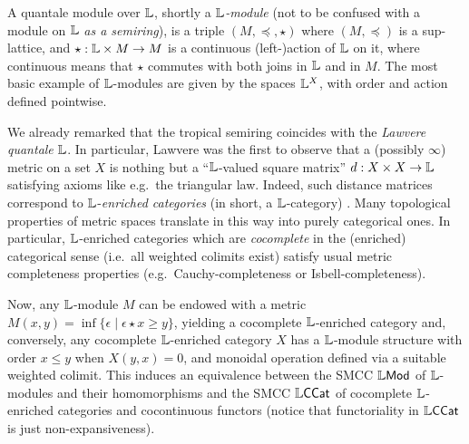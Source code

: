 \documentclass[submission,%
]{eptcs}
\begin{document}
A quantale module over $\mathbb{L}$, shortly a \emph{$\mathbb{L}$-module} (not to be confused with a module on $\mathbb{L}$ \emph{as a semiring}), is a triple  $(M,\preceq, \star)$ where $(M, \preceq)$ is a sup-lattice, and $\star: \mathbb{L} \times M \to M$ is a continuous (left-)action of $\mathbb{L}$ on it, where continuous means that $\star$ commutes with both joins in $\mathbb{L}$ and in $M$. 
The most basic example of $\mathbb{L}$-modules are given by the spaces $\mathbb{L}^{X}$, with order and action defined pointwise.



We already remarked that the tropical semiring coincides with the \emph{Lawvere quantale} $\mathbb{L}$.
In particular, Lawvere was the first to observe that a (possibly $\infty$) metric on a set $X$ is nothing but a ``$\mathbb{L}$-valued square matrix'' $d:X\times X\to \mathbb{L}$ satisfying axioms like e.g.~the triangular law.
Indeed, such distance matrices correspond to $\mathbb{L}$-\emph{enriched categories} (in short, a $\mathbb{L}$-category) \cite{Lawvere1973, Hofmann2014, Stubbe2014}.
Many topological properties of metric spaces translate in this way into purely categorical ones. In particular, $\mathbb{L}$-enriched categories which are \emph{cocomplete} in the (enriched) categorical sense (i.e.~all weighted colimits exist) satisfy usual metric completeness properties (e.g.~Cauchy-completeness or Isbell-completeness). 

Now, any $\mathbb{L}$-module $M$ can be endowed with a metric 
$M(x,y)=\inf\{\epsilon \mid \epsilon \star x \geq y\}$, yielding a cocomplete $\mathbb{L}$-enriched category and, conversely, any cocomplete $\mathbb{L}$-enriched category $X$ has a $\mathbb{L}$-module structure with order $x\leq y$ when $X(y,x)=0$, and monoidal operation defined via a suitable weighted colimit.
This induces an equivalence between the SMCC $\mathbb{L}\mathsf{Mod}$ of $\mathbb{L}$-modules and their homomorphisms and the SMCC $\mathbb{L}\mathsf{CCat}$ of cocomplete $\mathbb{L}$-enriched categories and cocontinuous functors (notice that functoriality in $\mathbb{L}\mathsf{CCat}$ is just non-expansiveness). 


%
%
\end{document}
